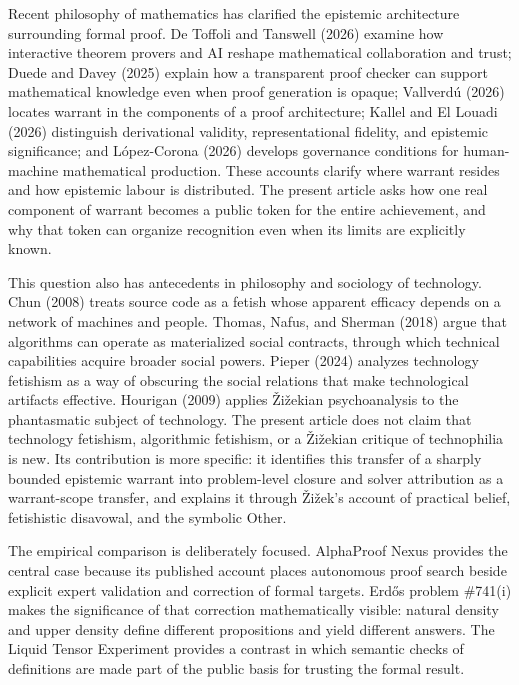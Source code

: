 \documentclass[pdflatex,sn-apa]{sn-jnl}
\begin{document}
Recent philosophy of mathematics has clarified the epistemic architecture surrounding formal proof. De Toffoli and Tanswell (2026) examine how interactive theorem provers and AI reshape mathematical collaboration and trust; Duede and Davey (2025) explain how a transparent proof checker can support mathematical knowledge even when proof generation is opaque; Vallverdú (2026) locates warrant in the components of a proof architecture; Kallel and El Louadi (2026) distinguish derivational validity, representational fidelity, and epistemic significance; and López-Corona (2026) develops governance conditions for human-machine mathematical production. These accounts clarify where warrant resides and how epistemic labour is distributed. The present article asks how one real component of warrant becomes a public token for the entire achievement, and why that token can organize recognition even when its limits are explicitly known.

This question also has antecedents in philosophy and sociology of technology. Chun (2008) treats source code as a fetish whose apparent efficacy depends on a network of machines and people. Thomas, Nafus, and Sherman (2018) argue that algorithms can operate as materialized social contracts, through which technical capabilities acquire broader social powers. Pieper (2024) analyzes technology fetishism as a way of obscuring the social relations that make technological artifacts effective. Hourigan (2009) applies Žižekian psychoanalysis to the phantasmatic subject of technology. The present article does not claim that technology fetishism, algorithmic fetishism, or a Žižekian critique of technophilia is new. Its contribution is more specific: it identifies this transfer of a sharply bounded epistemic warrant into problem-level closure and solver attribution as a warrant-scope transfer, and explains it through Žižek's account of practical belief, fetishistic disavowal, and the symbolic Other.

The empirical comparison is deliberately focused. AlphaProof Nexus provides the central case because its published account places autonomous proof search beside explicit expert validation and correction of formal targets. Erdős problem \#741(i) makes the significance of that correction mathematically visible: natural density and upper density define different propositions and yield different answers. The Liquid Tensor Experiment provides a contrast in which semantic checks of definitions are made part of the public basis for trusting the formal result.
\end{document}

